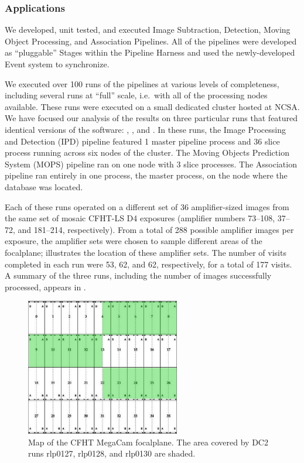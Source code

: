 \subsubsection*{Applications}

We developed, unit tested, and executed Image Subtraction, Detection, Moving Object Processing, and Association Pipelines.  All of the pipelines were developed as ``pluggable'' Stages within the Pipeline Harness and used the newly-developed Event system to synchronize.

We executed over 100 runs of the pipelines at various levels of completeness, including several runs at ``full'' scale, i.e.~with all of the processing nodes available. These runs were executed on a small dedicated cluster hosted at NCSA. We have focused our analysis of the results on three particular runs that featured identical versions of the software: , , and .  In these runs, the Image Processing and Detection (IPD) pipeline featured 1 master pipeline process and 36 slice process running across six nodes of the cluster.  The Moving Objects Prediction System (MOPS) pipeline ran on one node with 3 slice processes.  The Association pipeline ran entirely in one process, the master process, on the node where the database was located.

Each of these runs operated on a different set of 36 amplifier-sized images from the same set of mosaic CFHT-LS D4 exposures (amplifier numbers 73--108, 37--72, and 181--214, respectively).  From a total of 288 possible amplifier images per exposure, the amplifier sets were chosen to sample different areas of the focalplane;  illustrates the location of these amplifier sets.  The number of visits completed in each run were 53, 62, and 62, respectively, for a total of 177 visits.   A summary of the three runs, including the number of images successfully processed, appears in .  

\begin{figure}[htbp]
\begin{center}
\includegraphics[height=60mm] {figures/MegaCamMap}
\caption{Map of the CFHT MegaCam focalplane.  The area covered by DC2
  runs rlp0127, rlp0128, and rlp0130 are shaded.}
\label{SumFigMegaCamMap}
\end{center}
\end{figure}

